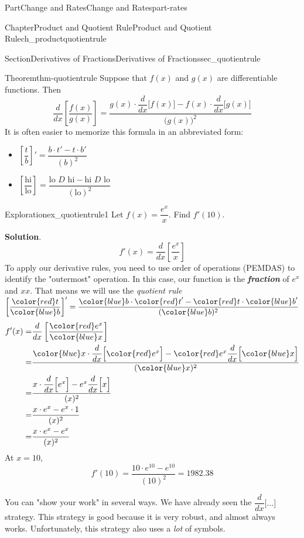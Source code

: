 \documentclass{tufte-book}
\newcommand{\blocktitlefont}{\relax}
\newcommand{\alert}[1]{\textbf{\textit{#1}}}
\numberwithin{equation}{chapter}
\newcommand{\red}[1]{   {\color{red}   #1}   }
\newcommand{\blue}[1]{  {\color{blue}  #1}  }
\newcommand{\ddx}[1]{ \dfrac{d}{dx} \Big[ #1 \Big]  }
\newcommand{\ddxfrac}[1]{ \dfrac{d}{dx} \left[ #1 \right]  }
\newcommand{\amp}{&}
\begin{document}
\begin{partptx}{Part}{Change and Rates}{}{Change and Rates}{}{}{part-rates}
\begin{chapterptx}{Chapter}{Product and Quotient Rule}{}{Product and Quotient Rule}{}{}{ch_productquotientrule}
\begin{sectionptx}{Section}{Derivatives of Fractions}{}{Derivatives of Fractions}{}{}{sec_quotientrule}
\begin{theorem}{Theorem}{}{}{thm-quotientrule}%
Suppose that \(f(x)\) and \(g(x)\) are differentiable functions.  Then%
\begin{equation*}
\ddxfrac{\dfrac{f(x)}{g(x)}} = \dfrac{g(x) \cdot \ddx{f(x)} - f(x) \cdot \ddx{g(x)} }{\Big(g(x)\Big)^2}
\end{equation*}
It is often easier to memorize this formula in an abbreviated form:%
\begin{itemize}[label=\textbullet]
\item{}\(\displaystyle \left[\dfrac{t}{b}\right]' = \dfrac{b\cdot t' - t\cdot b'}{(b)^2} \)%
\item{}\(\displaystyle \left[\dfrac{\text{hi}}{\text{lo}} \right] = \dfrac{\text{lo }D\text{ hi} - \text{hi }D\text{ lo} }{(\text{lo})^2}\)%
\end{itemize}
%
\end{theorem}
\begin{exploration}{Exploration}{}{ex_quotientrule1}%
Let \(f(x) = \dfrac{e^x}{x}\). Find \(f'(10)\).%
\par\smallskip%
\noindent\textbf{\blocktitlefont Solution}.\hypertarget{ex_quotientrule1-2}{}\quad{}%
\begin{equation*}
f'(x) = \ddxfrac{  \dfrac{e^x}{x}  }
\end{equation*}
To apply our derivative rules, you need to use order of operations (PEMDAS) to identify the "outermost" operation. In this case, our function is the \alert{fraction} of \(e^x\) and  \(xx\).  That means we will use the \emph{quotient rule} \(\left[\dfrac{\red{t}}{\blue{b}}\right]' = \dfrac{\blue{b}\cdot \red{t}' - \red{t}\cdot \blue{b}'}{(\blue{b})^2}\)%
\begin{align*}
f'(x) = \amp \ddxfrac{  \dfrac{\red{e^x}}{\blue{x}}  }\\
= \amp \dfrac{\blue{x}\cdot \ddx{\red{e^x}} - \red{e^x} \ddx{\blue{x}}}{(\blue{x})^2}\\
= \amp \dfrac{ x\cdot \ddx{ e^x } - e^x \ddx{ x }}{(x)^2}\\
= \amp \dfrac{ x\cdot e^x - e^x \cdot 1}{(x)^2}\\
= \amp \dfrac{ x\cdot e^x - e^x }{(x)^2}
\end{align*}
At \(x=10\),%
\begin{equation*}
f'(10) = \dfrac{ 10\cdot e^{10} - e^{10} }{(10)^2} = 1982.38
\end{equation*}
%
\end{exploration}%
You can "show your work" in several ways. We have already seen the \(\ddx{\dots}\) strategy. This strategy is good because it is very robust, and almost always works. Unfortunately, this strategy also uses a \emph{lot} of symbols.%

\end{sectionptx}
\end{chapterptx}
\end{partptx}
\end{document}
